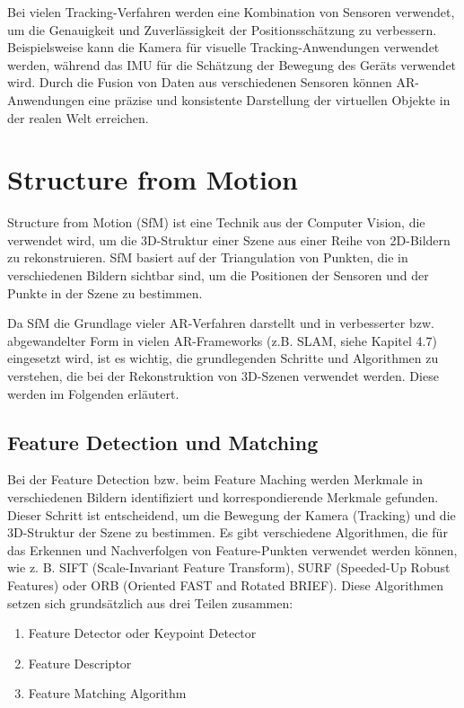 Bei vielen Tracking-Verfahren werden eine Kombination von Sensoren verwendet, um die Genauigkeit und Zuverlässigkeit der Positionsschätzung zu verbessern. Beispielsweise kann die Kamera für visuelle Tracking-Anwendungen verwendet werden, während das IMU für die Schätzung der Bewegung des Geräts verwendet wird. Durch die Fusion von Daten aus verschiedenen Sensoren können AR-Anwendungen eine präzise und konsistente Darstellung der virtuellen Objekte in der realen Welt erreichen.

\section{Structure from Motion}

Structure from Motion (SfM) ist eine Technik aus der Computer Vision, die verwendet wird, um die 3D-Struktur einer Szene aus einer Reihe von 2D-Bildern zu rekonstruieren. SfM basiert auf der Triangulation von Punkten, die in verschiedenen Bildern sichtbar sind, um die Positionen der Sensoren und der Punkte in der Szene zu bestimmen.

Da SfM die Grundlage vieler AR-Verfahren darstellt und in verbesserter bzw. abgewandelter Form in vielen AR-Frameworks (z.B. SLAM, siehe Kapitel 4.7) eingesetzt wird, ist es wichtig, die grundlegenden Schritte und Algorithmen zu verstehen, die bei der Rekonstruktion von 3D-Szenen verwendet werden. Diese werden im Folgenden erläutert.

\subsection{Feature Detection und Matching}

Bei der Feature Detection bzw. beim Feature Maching werden Merkmale in verschiedenen Bildern identifiziert und korrespondierende Merkmale gefunden. Dieser Schritt ist entscheidend, um die Bewegung der Kamera (Tracking) und die 3D-Struktur der Szene zu bestimmen. Es gibt verschiedene Algorithmen, die für das Erkennen und Nachverfolgen von Feature-Punkten verwendet werden können, wie z. B. SIFT (Scale-Invariant Feature Transform), SURF (Speeded-Up Robust Features) oder ORB (Oriented FAST and Rotated BRIEF). Diese Algorithmen setzen sich grundsätzlich aus drei Teilen zusammen:

\begin{enumerate}
    \item Feature Detector oder Keypoint Detector
    \item Feature Descriptor
    \item Feature Matching Algorithm
\end{enumerate}

